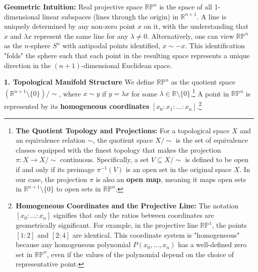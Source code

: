\begin{solution}
\textbf{Geometric Intuition:} Real projective space $\mathbb{RP}^n$ is the space of all 1-dimensional linear subspaces (lines through the origin) in $\mathbb{R}^{n+1}$. A line is uniquely determined by any non-zero point $x$ on it, with the understanding that $x$ and $\lambda x$ represent the same line for any $\lambda \neq 0$. Alternatively, one can view $\mathbb{RP}^n$ as the $n$-sphere $S^n$ with antipodal points identified, $x \sim -x$. This identification "folds" the sphere such that each point in the resulting space represents a unique direction in the $(n+1)$-dimensional Euclidean space.

\textbf{1. Topological Manifold Structure}
We define $\mathbb{RP}^n$ as the quotient space $(\mathbb{R}^{n+1} \setminus \{0\}) / \sim$, where $x \sim y$ if $y = \lambda x$ for some $\lambda \in \mathbb{R} \setminus \{0\}$.\footnote{\textbf{The Quotient Topology and Projections:} For a topological space $X$ and an equivalence relation $\sim$, the quotient space $X/\sim$ is the set of equivalence classes equipped with the finest topology that makes the projection $\pi: X \to X/\sim$ continuous. Specifically, a set $V \subseteq X/\sim$ is defined to be open if and only if its preimage $\pi^{-1}(V)$ is an open set in the original space $X$. In our case, the projection $\pi$ is also an \textbf{open map}, meaning it maps open sets in $\mathbb{R}^{n+1} \setminus \{0\}$ to open sets in $\mathbb{RP}^n$.} A point in $\mathbb{RP}^n$ is represented by its \textbf{homogeneous coordinates} $[x_0 : x_1 : \dots : x_n]$.\footnote{\textbf{Homogeneous Coordinates and the Projective Line:} The notation $[x_0 : \dots : x_n]$ signifies that only the ratios between coordinates are geometrically significant. For example, in the projective line $\mathbb{RP}^1$, the points $[1:2]$ and $[2:4]$ are identical. This coordinate system is "homogeneous" because any homogeneous polynomial $P(x_0, \dots, x_n)$ has a well-defined zero set in $\mathbb{RP}^n$, even if the values of the polynomial depend on the choice of representative point.}


\end{solution}
